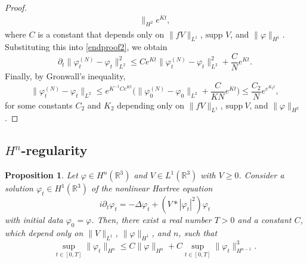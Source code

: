 \documentclass[11pt,a4paper]{scrartcl}
\newtheorem{prp}[thm]{Proposition}
\newcommand{\R}{\mathds{R}}
\begin{document}
\begin{proof}
\begin{align*}
    \|_{H^2} e^{Kt},
  \end{align*}
  where $C$ is a constant that depends only on $\| fV \|_{L^1}$, $\text{supp
  }V$, and $\| \varphi \|_{H^1}$. Substituting this into \eqref{endproof2}, we
  obtain
  \[
    \partial_t \| \varphi_t^{(N)} - \varphi_t \|_{L^2}^2 \le C e^{Kt} \|
    \varphi_t^{(N)} - \varphi_t \|_{L^2}^2 + \frac{C}{N} e^{Kt}.
  \]
  Finally, by Gronwall's inequality,
  \[
    \| \varphi_t^{(N)} - \varphi_t \|_{L^2} \le e^{K^{-1} C e^{Kt}} \Big( \|
    \varphi_0^{(N)} - \varphi_0 \|_{L^2} + \frac{C}{KN} e^{Kt} \Big) \le
    \frac{C_2}{N} e^{e^{K_2 t}},
  \]
  for some constants $C_2$ and $K_2$ depending only on $\| fV \|_{L^1}$,
  $\text{supp} \ V$, and $\| \varphi \|_{H^2}$.
\end{proof}


\subsection{$H^n$-regularity}


\begin{prp} \label{p:regn}
  Let $\varphi \in H^n(\R^3)$ and $V \in L^1(\R^3)$ with $V \ge 0$. Consider a
  solution $\varphi_t \in H^1(\R^3)$ of the nonlinear Hartree equation
  \[
    i \partial_t \varphi_t = - \Delta \varphi_t + (V * |\varphi_t|^2)
    \varphi_t
  \]
  with initial data $\varphi_0 = \varphi$. Then, there exist a real number $T
  > 0$ and a constant $C$, which depend only on $\| V \|_{L^1}$, $\| \varphi
  \|_{H^1}$, and $n$, such that
  \[
    \sup_{t \in [0,T]} \| \varphi_t \|_{H^n} \le C \| \varphi \|_{H^n} + C
    \sup_{t \in [0,T]} \| \varphi_t \|_{H^{n-1}}^3.
  \]
\end{prp}
\end{document}
